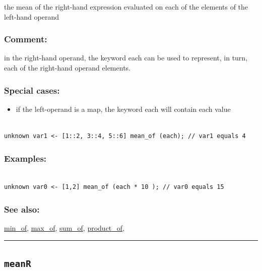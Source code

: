 \documentclass[]{book}
\providecommand{\tightlist}{%
  \setlength{\itemsep}{0pt}\setlength{\parskip}{0pt}}
\theoremstyle{definition}
\theoremstyle{definition}
\theoremstyle{definition}
\theoremstyle{remark}
\begin{document}
the mean of the right-hand expression evaluated on each of the elements
of the left-hand operand

\subsubsection{Comment:}\label{comment-69}

in the right-hand operand, the keyword each can be used to represent, in
turn, each of the right-hand operand elements.

\subsubsection{Special cases:}\label{special-cases-96}

\begin{itemize}
\tightlist
\item
  if the left-operand is a map, the keyword each will contain each value
\end{itemize}

\begin{verbatim}
 
unknown var1 <- [1::2, 3::4, 5::6] mean_of (each); // var1 equals 4
\end{verbatim}

\subsubsection{Examples:}\label{examples-238}

\begin{verbatim}
 
unknown var0 <- [1,2] mean_of (each * 10 ); // var0 equals 15
\end{verbatim}

\subsubsection{See also:}\label{see-also-139}

\href{operators-i-to-m.html\#min_of}{min\_of},
\href{operators-i-to-m.html\#max_of}{max\_of},
\href{operators-s-to-z.html\#sum_of}{sum\_of},
\href{operators-n-to-r.html\#product_of}{product\_of},

\begin{center}\rule{0.5\linewidth}{\linethickness}\end{center}

\subsection{\texorpdfstring{\texttt{meanR}}{meanR}}\label{meanr}
\end{document}

